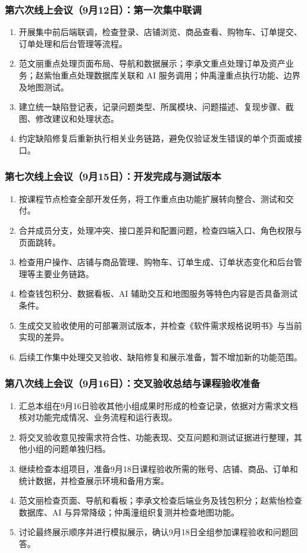 \subsubsection{第六次线上会议（9月12日）：第一次集中联调}
\begin{enumerate}
  \item 开展集中前后端联调，检查登录、店铺浏览、商品查看、购物车、订单提交、订单处理和后台管理等流程。
  \item 范文丽重点处理页面布局、导航和数据展示；李承文重点处理订单及资产业务；赵紫怡重点处理数据库关联和 AI 服务调用；仲禹潼重点执行功能、边界及地图测试。
  \item 建立统一缺陷登记表，记录问题类型、所属模块、问题描述、复现步骤、截图、修改建议和处理状态。
  \item 约定缺陷修复后重新执行相关业务链路，避免仅验证发生错误的单个页面或接口。
\end{enumerate}

\subsubsection{第七次线上会议（9月15日）：开发完成与测试版本}
\begin{enumerate}
  \item 按课程节点检查全部开发任务，将工作重点由功能扩展转向整合、测试和交付。
  \item 合并成员分支，处理冲突、接口差异和配置问题，检查四端入口、角色权限与页面跳转。
  \item 检查用户操作、店铺与商品管理、购物车、订单生成、订单状态变化和后台管理等主要业务链路。
  \item 检查钱包积分、数据看板、AI 辅助交互和地图服务等特色内容是否具备测试条件。
  \item 生成交叉验收使用的可部署测试版本，并检查《软件需求规格说明书》与当前实现的差异。
  \item 后续工作集中处理交叉验收、缺陷修复和展示准备，暂不增加新的功能范围。
\end{enumerate}

\subsubsection{第八次线上会议（9月16日）：交叉验收总结与课程验收准备}
\begin{enumerate}
  \item 汇总本组在9月16日验收其他小组成果时形成的检查记录，依据对方需求文档核对功能完成情况、业务流程和运行表现。
  \item 将交叉验收意见按需求符合性、功能表现、交互问题和测试证据进行整理，其他小组的问题单独归档。
  \item 继续检查本组项目，准备9月18日课程验收所需的账号、店铺、商品、订单和统计数据，并检查展示环境和备用方案。
  \item 范文丽检查页面、导航和看板；李承文检查后端业务及钱包积分；赵紫怡检查数据库、AI 与异常降级；仲禹潼组织复测并检查地图功能。
  \item 讨论最终展示顺序并进行模拟展示，确认9月18日全组参加课程验收和问题回答。
\end{enumerate}

